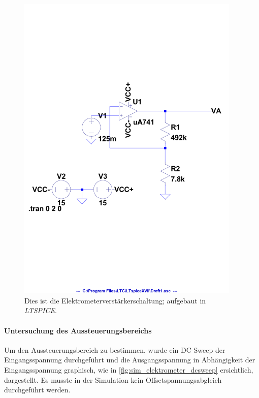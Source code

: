 \documentclass[12pt,english,ngerman]{scrartcl}
\begin{document}
\begin{figure}[H]
  \centering
    \includegraphics[width=0.95\textwidth]{./figures/elektrometer/sim/sim_schaltung.pdf}
  \caption{Dies ist die Elektrometerverstärkerschaltung; aufgebaut in \textit{LTSPICE}.}
  \label{fig:sim_elektrometer_schaltung}
\end{figure}


\paragraph{Untersuchung des Aussteuerungsbereichs} \label{sec:mess_aussteuerungsbereich}

Um den Aussteuerungsbereich zu bestimmen, wurde ein DC-Sweep der
Eingangsspannung durchgeführt und die Ausgangsspannung in Abhängigkeit der
Eingangsspannung graphisch, wie in \autoref{fig:sim_elektrometer_dcsweep}
ersichtlich, dargestellt. Es musste in der Simulation kein
Offsetspannungsabgleich durchgeführt werden.
\end{document}
